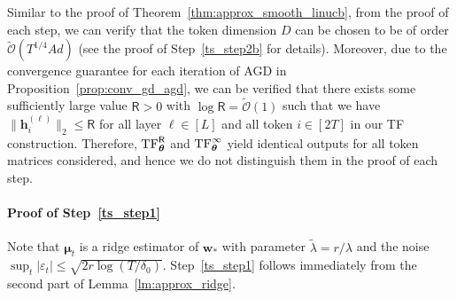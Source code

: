 \documentclass[10pt]{article}
\newcommand{\eps}{\varepsilon}
\newcommand{\<}{\left\langle}
\renewcommand{\>}{\right\rangle}
\newcommand{\lth}{{(\ell)}}
\newcommand{\TF}{{\rm TF}}
\newcommand{\Tpsmean}{{{\mathbf\mu}}}
\newcommand{\Tpspar}{{\lambda}}
\newcommand{\Tpsparn}{{r}}
\newcommand{\tcO}{{\tilde{\mathcal O}}}
\newcommand{\totlen}{{T}}
\newcommand{\clipval}{{\mathsf{R}}}
\def\btheta{{\boldsymbol \theta}}
\def\bh{{\mathbf h}}
\def\bw{{\mathbf w}}
\begin{document}
 Similar to the proof of Theorem~\ref{thm:approx_smooth_linucb}, from the proof of each step, we can verify that the token dimension $D$ can be chosen to be of order $\tcO(T^{1/4}Ad)$ (see the proof of Step~\ref{ts_step2b} for details). Moreover, due to the convergence guarantee for each iteration of AGD in Proposition~\ref{prop:conv_gd_agd}, we can be verified that there exists some sufficiently large value $\clipval>0$ with $\log \clipval=\tcO(1)$ such that  we have $\| \bh_i^{\lth} \|_{2} \leq\clipval$
 for all layer $\ell\in[L]$ and all token $i\in[2\totlen]$ in our TF construction. Therefore, $\TF^\clipval_\btheta$ and $\TF^\infty_\btheta$ yield identical outputs for all token matrices considered, and hence we do not distinguish them in the proof of each step.
\paragraph{Proof of Step~\ref{ts_step1}} Note that $\Tpsmean_t$ is a ridge estimator of $\bw_*$ with parameter $\widetilde\lambda=\Tpsparn/\Tpspar$ and the noise $\sup_t|\eps_t|\leq \sqrt{2\Tpsparn\log(T/{\delta_0})}$. Step~\ref{ts_step1} follows immediately  from the second part of Lemma~\ref{lm:approx_ridge}.
\end{document}
